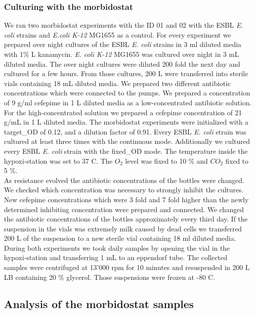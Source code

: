 \subsubsection{Culturing with the morbidostat}
We ran two morbidostat experiments with the ID 01 and 02 with the ESBL \textit{E. coli} strains and \textit{E.coli K-12} MG1655 as a control. For every experiment we prepared over night cultures of the ESBL \textit{E. coli} strains in 3 ml diluted media with 1\% L kanamycin. \textit{E. coli K-12} MG1655 was cultured over night in 3 mL diluted media. The over night cultures were diluted 200 fold the next day and cultured for a few hours. From those cultures, 200 \textmu L were transferred into sterile vials containing 18 mL diluted media. We prepared two different antibiotic concentrations which were connected to the pumps. We prepared a concentration of 9 \textmu g/ml cefepime in 1 L diluted media as a low-concentrated antibiotic solution. For the high-concentrated solution we prepared a cefepime concentration of 21 \textmu g/mL in 1 L diluted media. The morbidostat experiments were initialized with a target\_OD of 0.12, and a dilution factor of 0.91. Every ESBL \textit{E. coli} strain was cultured at least three times with the continuous mode. Additionally we cultured every ESBL \textit{E. coli} strain with the fixed\_OD mode. The temperature inside the hypoxi-station was set to 37 \degree C. The $O_2$ level was fixed to 10 \% and $CO_2$ fixed to 5 \%. \\
As resistance evolved the antibiotic concentrations of the bottles were changed. We checked which concentration was necessary to strongly inhibit the cultures. New cefepime concentrations which were 3 fold and 7 fold higher than the newly determined inhibiting concentration were prepared and connected. We changed the antibiotic concentrations of the bottles approximately every third day. If the suspension in the vials was extremely milk caused by dead cells we transferred 200 \textmu L of the suspension to a new sterile vial containing 18 ml diluted media.  \\
During both experiments we took daily samples by opening the vial in the hypoxi-station and transferring 1 mL to an eppendorf tube. The collected samples were centrifuged at 13'000 rpm for 10 minutes and resuspended in 200 \textmu L LB containing 20 \% glycerol. Those suspensions were frozen at -80 \degree C.\\

\subsection{Analysis of the morbidostat samples}
